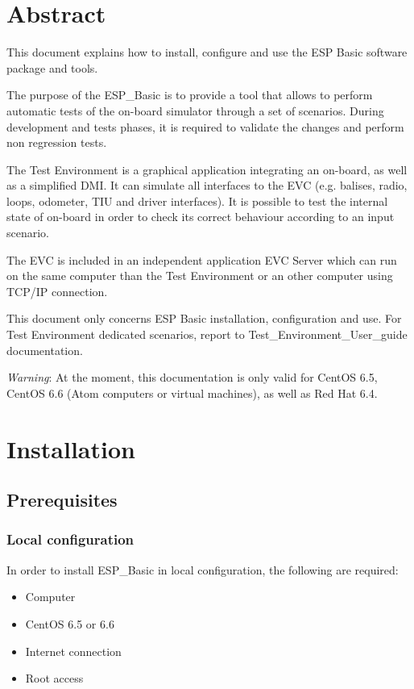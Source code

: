\chapter{Abstract}
This document explains how to install, configure and use the ESP Basic software package and tools.

The purpose of the ESP\_Basic is to provide a tool that allows to perform automatic tests of the on-board simulator through a set of scenarios. During development and tests phases, it is required to validate the changes and perform non regression tests.

The Test Environment is a graphical application integrating an on-board, as well as a simplified DMI. It can simulate all interfaces to the EVC (e.g. balises, radio, loops, odometer, TIU and driver interfaces). It is possible to test the internal state of on-board in order to check its correct behaviour according to an input scenario.

The EVC is included in an independent application EVC Server which can run on the same computer than the Test Environment or an other computer using TCP/IP connection.

This document only concerns ESP Basic installation, configuration and use. For Test Environment dedicated scenarios, report to Test\_Environment\_User\_guide documentation.

\emph{Warning}: At the moment, this documentation is only valid for CentOS 6.5, CentOS 6.6 (Atom computers or virtual machines), as well as Red Hat 6.4.

\chapter{Installation}
\section{Prerequisites}
\subsection{Local configuration}
In order to install ESP\_Basic in local configuration, the following are required:
\begin{itemize}
\item Computer
\item CentOS 6.5 or 6.6
\item Internet connection
\item Root access
\end{itemize}

